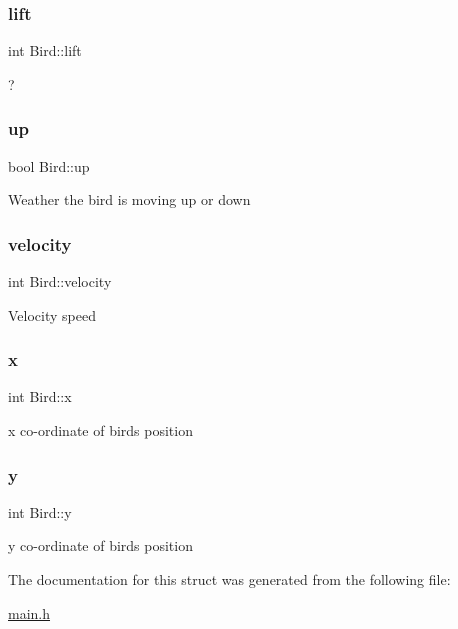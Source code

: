 \subsubsection{\texorpdfstring{lift}{lift}}
{\footnotesize\ttfamily int Bird\+::lift}

? \mbox{\label{struct_bird_a7736a1da7f311ccc4caf83e031177a31}} 
\subsubsection{\texorpdfstring{up}{up}}
{\footnotesize\ttfamily bool Bird\+::up}

Weather the bird is moving up or down \mbox{\label{struct_bird_a202c41f509c3e64c4e7c1c122e76ce8e}} 
\subsubsection{\texorpdfstring{velocity}{velocity}}
{\footnotesize\ttfamily int Bird\+::velocity}

Velocity speed \mbox{\label{struct_bird_ae4657ec5b3f2a736b7a17951590e5bea}} 
\subsubsection{\texorpdfstring{x}{x}}
{\footnotesize\ttfamily int Bird\+::x}

x co-\/ordinate of birds position \mbox{\label{struct_bird_ae2ece10ede5691ff56faa76969a24b3a}} 
\subsubsection{\texorpdfstring{y}{y}}
{\footnotesize\ttfamily int Bird\+::y}

y co-\/ordinate of birds position 

The documentation for this struct was generated from the following file\+:\begin{DoxyCompactItemize}
\item 
\hyperlink{main_8h}{main.\+h}\end{DoxyCompactItemize}

